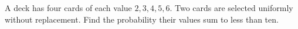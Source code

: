 A deck has four cards of each value $2,3,4,5,6$. Two cards are selected uniformly without replacement. Find the probability their values sum to less than ten.
